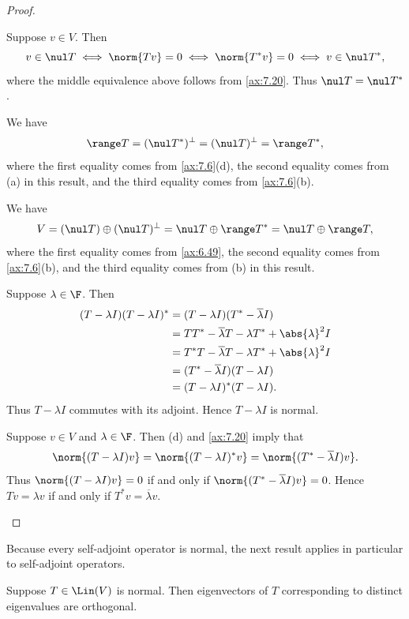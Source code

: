 \begin{proof}\leavevmode
\begin{parts}
\item Suppose $v\in V$. Then
  \[ v\in\nul T \iff \norm{Tv}=0 \iff \norm{T^*v}=0 \iff v\in\nul T^*, \]
  where the middle equivalence above follows from \ref{ax:7.20}. Thus
  $\nul T=\nul T^*$.
\item We have
  \[ \range T = (\nul T^*)^\perp = (\nul T)^\perp = \range T^*, \]
  where the first equality comes from \ref{ax:7.6}(d), the second equality
  comes from (a) in this result, and the third equality comes from
  \ref{ax:7.6}(b).
\item We have
  \[ V = (\nul T)\oplus(\nul T)^\perp = \nul T\oplus\range T^*
       = \nul T\oplus\range T, \]
  where the first equality comes from \ref{ax:6.49}, the second equality comes
  from \ref{ax:7.6}(b), and the third equality comes from (b) in this result.
\item Suppose $\lambda\in\F$. Then
  \begin{align*}
  (T-\lambda I)(T-\lambda I)^* &= (T-\lambda I)(T^*-\overline{\lambda}I)\\
    &= TT^*-\overline{\lambda}T-\lambda T^*+\abs{\lambda}^2I\\
    &= T^*T-\overline{\lambda}T-\lambda T^*+\abs{\lambda}^2I\\
    &= (T^*-\overline{\lambda}I)(T-\lambda I)\\
    &= (T-\lambda I)^*(T-\lambda I).
  \end{align*}
  Thus $T-\lambda I$ commutes with its adjoint. Hence $T-\lambda I$ is normal.
\item Suppose $v\in V$ and $\lambda\in\F$. Then (d) and \ref{ax:7.20} imply that
  \[ \norm{(T-\lambda I)v} = \norm{(T-\lambda I)^*v}
     = \norm{(T^*-\overline{\lambda}I)v}. \]
  Thus $\norm{(T-\lambda I)v}=0$ if and only if
  $\norm{(T^*-\overline{\lambda}I)v}=0$. Hence $Tv=\lambda v$ if and only if
  $T^*v=\overline{\lambda}v$. \qedhere
\end{parts}
\end{proof}

Because every self-adjoint operator is normal, the next result applies in
particular to self-adjoint operators.

\begin{result}\label{ax:7.22}
Suppose $T\in\Lin(V)$ is normal. Then eigenvectors of $T$ corresponding to
distinct eigenvalues are orthogonal.
\end{result}

